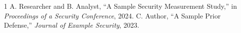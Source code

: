 \documentclass[letterpaper,twocolumn,10pt]{article}
\begin{document}

\maketitle











\begin{thebibliography}{1}
 A. Researcher and B. Analyst, ``A Sample Security Measurement Study,'' in \emph{Proceedings of a Security Conference}, 2024.
 C. Author, ``A Sample Prior Defense,'' \emph{Journal of Example Security}, 2023.
\end{thebibliography}
\end{document}
